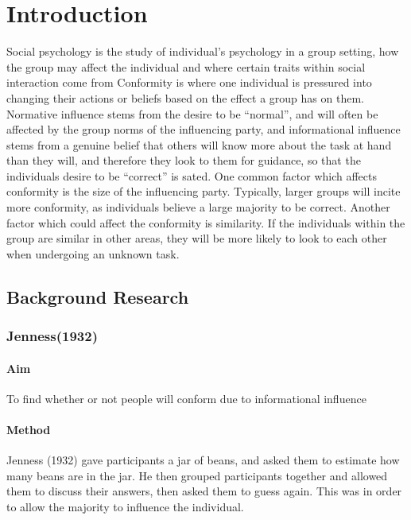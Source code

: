 \documentclass{article}
\begin{document}
\maketitle
\tableofcontents

\chapter{Introduction}
Social psychology is the study of individual’s psychology in a group setting,  how the group may affect the individual and where certain traits within social interaction come from Conformity is where one individual is pressured into changing their actions or beliefs based on the effect a group has on them. Normative influence stems from the desire to be “normal”, and will often be affected by the group norms of the influencing party, and informational influence stems from a genuine belief that others will know more about the task at hand than they will, and therefore they look to them for guidance, so that the individuals desire to be “correct” is sated. One common factor which affects conformity is the size of the influencing party. Typically, larger groups will incite more conformity, as individuals believe a large majority to be correct. Another factor which could affect the conformity is similarity. If the individuals within the group are similar in other areas, they will be more likely to look to each other when undergoing an unknown task.

\section{Background Research}

\subsection{Jenness(1932)}
\subsubsection{Aim}
To find whether or not people will conform due to informational influence
\subsubsection{Method}
Jenness (1932) gave participants a jar of beans, and asked them to estimate how many beans are in the jar. He then grouped participants together and allowed them to discuss their answers, then asked them to guess again. This was in order to allow the majority to influence the individual.
\end{document}
